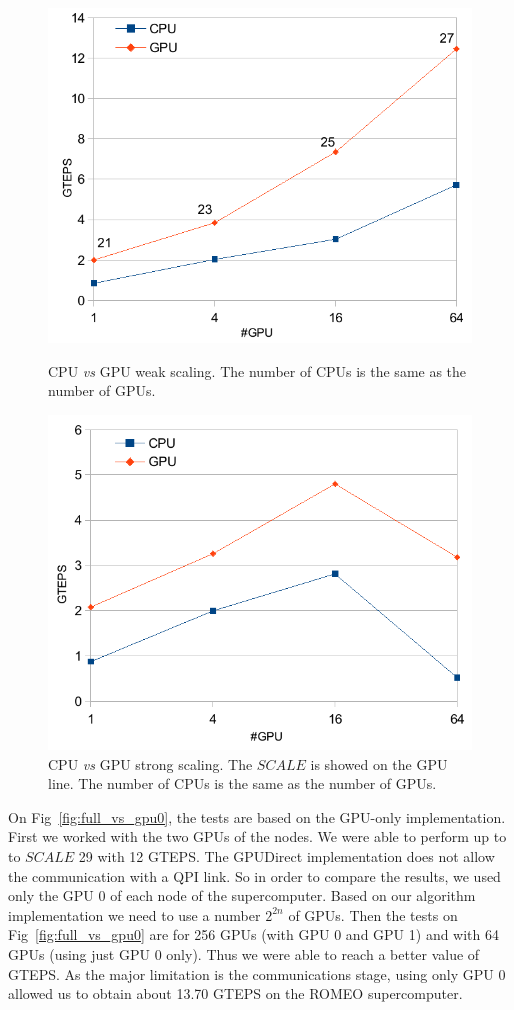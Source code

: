 \begin{figure}[htb]
\begin{minipage}[b]{0.45\linewidth}
\centering
\includegraphics[width=.7\linewidth]{figures/graph500/weak_scaling}
\caption[]{CPU \textit{vs} GPU weak scaling. The number of CPUs is the same as the number of GPUs.}
\label{fig:bfs_weak_scaling}
\end{minipage}
\begin{minipage}[b]{0.45\linewidth}
\centering
\includegraphics[width=.7\linewidth]{figures/graph500/strong_scaling}
\caption[]{CPU \textit{vs} GPU strong scaling. The $SCALE$ is showed on the GPU line. The number of CPUs is the same as the number of GPUs.}
\label{fig:bfs_strong_scaling}
\end{minipage}
\end{figure}


On Fig~\ref{fig:full_vs_gpu0}, the tests are based on the GPU-only implementation. 
First we worked with the two GPUs of the nodes. 
We were able to perform up to to $SCALE$ 29 with 12 GTEPS. 
The GPUDirect implementation does not allow the communication with a QPI link. 
So in order to compare the results, we used only the GPU 0 of each node of the supercomputer. 
Based on our algorithm implementation we need to use a number $2^{2n}$ of GPUs. 
Then the tests on Fig~\ref{fig:full_vs_gpu0} are for 256 GPUs (with GPU 0 and GPU 1) and with 64 GPUs (using just GPU 0 only). 
Thus we were able to reach a better value of GTEPS. 
As the major limitation is the communications stage, using only GPU 0 allowed us to obtain about 13.70 GTEPS on the ROMEO supercomputer. 

